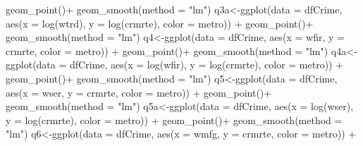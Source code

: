 \documentclass[]{article}
\newenvironment{Shaded}{}{}
\newcommand{\DataTypeTok}[1]{#1}
\newcommand{\KeywordTok}[1]{\textcolor[rgb]{0.00,0.00,1.00}{#1}}
\newcommand{\NormalTok}[1]{#1}
\newcommand{\OperatorTok}[1]{#1}
\newcommand{\StringTok}[1]{\textcolor[rgb]{0.00,0.50,0.50}{#1}}
\begin{document}
\begin{Shaded}
\begin{Highlighting}[]
\StringTok{      }\KeywordTok{geom_point}\NormalTok{()}\OperatorTok{+}
\StringTok{  }\KeywordTok{geom_smooth}\NormalTok{(}\DataTypeTok{method =} \StringTok{"lm"}\NormalTok{)}
\NormalTok{q3a<-}\KeywordTok{ggplot}\NormalTok{(}\DataTypeTok{data =}\NormalTok{ dfCrime, }\KeywordTok{aes}\NormalTok{(}\DataTypeTok{x =} \KeywordTok{log}\NormalTok{(wtrd), }\DataTypeTok{y =} \KeywordTok{log}\NormalTok{(crmrte), }\DataTypeTok{color =}\NormalTok{ metro)) }\OperatorTok{+}
\StringTok{      }\KeywordTok{geom_point}\NormalTok{()}\OperatorTok{+}
\StringTok{  }\KeywordTok{geom_smooth}\NormalTok{(}\DataTypeTok{method =} \StringTok{"lm"}\NormalTok{)}
\NormalTok{q4<-}\KeywordTok{ggplot}\NormalTok{(}\DataTypeTok{data =}\NormalTok{ dfCrime, }\KeywordTok{aes}\NormalTok{(}\DataTypeTok{x =}\NormalTok{ wfir, }\DataTypeTok{y =}\NormalTok{ crmrte, }\DataTypeTok{color =}\NormalTok{ metro)) }\OperatorTok{+}
\StringTok{      }\KeywordTok{geom_point}\NormalTok{()}\OperatorTok{+}
\StringTok{  }\KeywordTok{geom_smooth}\NormalTok{(}\DataTypeTok{method =} \StringTok{"lm"}\NormalTok{)}
\NormalTok{q4a<-}\KeywordTok{ggplot}\NormalTok{(}\DataTypeTok{data =}\NormalTok{ dfCrime, }\KeywordTok{aes}\NormalTok{(}\DataTypeTok{x =} \KeywordTok{log}\NormalTok{(wfir), }\DataTypeTok{y =} \KeywordTok{log}\NormalTok{(crmrte), }\DataTypeTok{color =}\NormalTok{ metro)) }\OperatorTok{+}
\StringTok{      }\KeywordTok{geom_point}\NormalTok{()}\OperatorTok{+}
\StringTok{  }\KeywordTok{geom_smooth}\NormalTok{(}\DataTypeTok{method =} \StringTok{"lm"}\NormalTok{)}
\NormalTok{q5<-}\KeywordTok{ggplot}\NormalTok{(}\DataTypeTok{data =}\NormalTok{ dfCrime, }\KeywordTok{aes}\NormalTok{(}\DataTypeTok{x =}\NormalTok{ wser, }\DataTypeTok{y =}\NormalTok{ crmrte, }\DataTypeTok{color =}\NormalTok{ metro)) }\OperatorTok{+}
\StringTok{      }\KeywordTok{geom_point}\NormalTok{()}\OperatorTok{+}
\StringTok{  }\KeywordTok{geom_smooth}\NormalTok{(}\DataTypeTok{method =} \StringTok{"lm"}\NormalTok{)}
\NormalTok{q5a<-}\KeywordTok{ggplot}\NormalTok{(}\DataTypeTok{data =}\NormalTok{ dfCrime, }\KeywordTok{aes}\NormalTok{(}\DataTypeTok{x =} \KeywordTok{log}\NormalTok{(wser), }\DataTypeTok{y =} \KeywordTok{log}\NormalTok{(crmrte), }\DataTypeTok{color =}\NormalTok{ metro)) }\OperatorTok{+}
\StringTok{      }\KeywordTok{geom_point}\NormalTok{()}\OperatorTok{+}
\StringTok{  }\KeywordTok{geom_smooth}\NormalTok{(}\DataTypeTok{method =} \StringTok{"lm"}\NormalTok{)}
\NormalTok{q6<-}\KeywordTok{ggplot}\NormalTok{(}\DataTypeTok{data =}\NormalTok{ dfCrime, }\KeywordTok{aes}\NormalTok{(}\DataTypeTok{x =}\NormalTok{ wmfg, }\DataTypeTok{y =}\NormalTok{ crmrte, }\DataTypeTok{color =}\NormalTok{ metro)) }\OperatorTok{+}

\end{Highlighting}
\end{Shaded}
\end{document}
